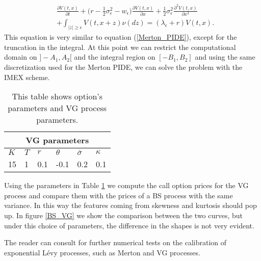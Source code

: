 \begin{align}\label{VG_JD}
&  \frac{\partial V(t,x)}{\partial t} +
 \bigl( r-\frac{1}{2}\sigma_{\epsilon}^2 - w_{\epsilon} \bigr) \frac{\partial V(t,x)}{\partial x} 
 + \frac{1}{2}\sigma_{\epsilon}^2 \frac{\partial^2 V(t,x)}{\partial x^2} \\ \nonumber
 &+ \int_{|z| \geq \epsilon} V(t,x+z) \nu(dz) = (\lambda_{\epsilon} + r) V(t,x).
\end{align}
This equation is very similar to equation (\ref{Merton_PIDE}), except for the truncation in the integral. 
At this point we can restrict the computational domain on $]-A_1,A_2[$ and the integral region on $[-B_1,B_2]$ and using the same discretization
used for the Merton PIDE, we can solve the problem with the IMEX scheme.\\
\begin{table}[h!]
\begin{center}
 \begin{minipage}{0.8\linewidth}
  \centering
 \begin{tabular}{||l|l|l|l||l|l||}
\hline
  \multicolumn{6}{|c|}{VG parameters} \\
 \hline
$K$ & $T$ & $r$ & $\theta$ & $\bar\sigma$ &$\kappa$  \\
\hline
15 & 1 & 0.1 & -0.1 & 0.2 & 0.1 \\
\hline
\end{tabular}
  \caption{This table shows option's parameters and VG process parameters.}
  \label{tab:VG}
\end{minipage}
  \end{center}
\end{table}
Using the parameters in Table \ref{tab:VG} we compute the call option prices for the VG process and compare them with the prices of a BS process with the same variance.
In this way the features coming from skewness and kurtosis should pop up.  
In figure \ref{BS_VG} we show the comparison between the two curves, but under this choice of parameters, the difference in the shapes is not very evident.

The reader can consult \cite{Schoutens} for further numerical tests on the calibration of exponential Lévy processes, such as Merton and VG processes. 



